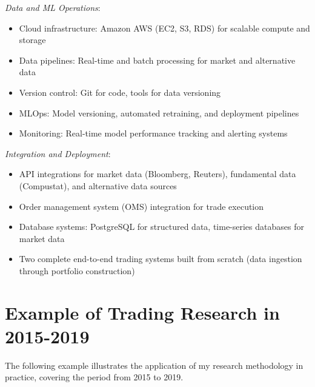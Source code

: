 \documentclass[11pt, letterpaper]{article}
\begin{document}
  \emph{Data and ML Operations}:

  \begin{itemize}
    \item Cloud infrastructure: Amazon AWS (EC2, S3, RDS) for scalable compute
      and storage

    \item Data pipelines: Real-time and batch processing for market and
      alternative data

    \item Version control: Git for code, tools for data versioning

    \item MLOps: Model versioning, automated retraining, and deployment
      pipelines

    \item Monitoring: Real-time model performance tracking and alerting
      systems
  \end{itemize}

  \emph{Integration and Deployment}:

  \begin{itemize}
    \item API integrations for market data (Bloomberg, Reuters), fundamental
      data (Compustat), and alternative data sources

    \item Order management system (OMS) integration for trade execution

    \item Database systems: PostgreSQL for structured data, time-series databases
      for market data

    \item Two complete end-to-end trading systems built from scratch (data
      ingestion through portfolio construction)
  \end{itemize}

  \section{Example of Trading Research in 2015-2019}
  \label{example-of-trading-research-in-2015-2019}

  The following example illustrates the application of my research
  methodology in practice, covering the period from 2015 to 2019.

\end{document}
